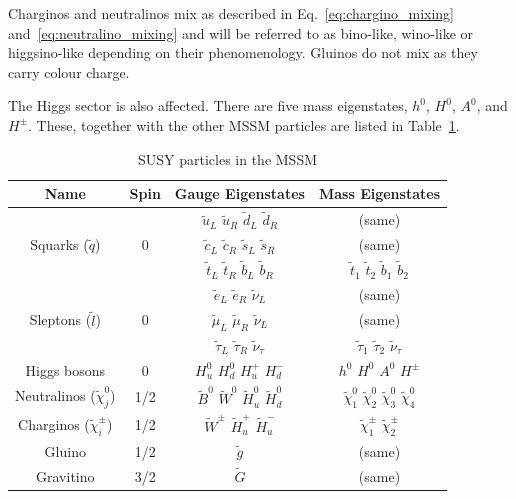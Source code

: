 				Charginos and neutralinos mix as described in Eq.~\ref{eq:chargino_mixing} and~\ref{eq:neutralino_mixing} and will be referred to as bino-like, wino-like or higgsino-like depending on their phenomenology. Gluinos do not mix as they carry colour charge. 

				The Higgs sector is also affected. There are five mass eigenstates, $h^0$, $H^0$, $A^0$, and $H^{\pm}$. These, together with the other MSSM particles are listed in Table~\ref{tab:MSSM_particles}. 
				
				\begin{table}[!htb]\centering\caption{SUSY particles in the MSSM}							
					\begin{tabular}{|c|c|c|c|}
						\hline
						\textbf{Name} & \textbf{Spin} & \textbf{Gauge Eigenstates} & \textbf{Mass Eigenstates} \\ \hline \hline
						
						\multirow{3}{*}{Squarks ($\tilde{q}$)} & \multirow{3}{*}{0} 
						& $\tilde{u}_L$ $\tilde{u}_R$ $\tilde{d}_L$ $\tilde{d}_R$ & (same) \\
						& & $\tilde{c}_L$ $\tilde{c}_R$ $\tilde{s}_L$ $\tilde{s}_R$ & (same) \\
						& & $\tilde{t}_L$ $\tilde{t}_R$ $\tilde{b}_L$ $\tilde{b}_R$ & $\tilde{t}_1$ $\tilde{t}_2$ $\tilde{b}_1$ $\tilde{b}_2$ \\ \hline

						\multirow{3}{*}{Sleptons ($\tilde{l}$)} & \multirow{3}{*}{0} 
						& $\tilde{e}_L$ $\tilde{e}_R$ $\tilde{\nu}_L$ & (same) \\
						& & $\tilde{\mu}_L$ $\tilde{\mu}_R$ $\tilde{\nu}_L$ & (same) \\ 
						& & $\tilde{\tau}_L$ $\tilde{\tau}_R$ $\tilde{\nu}_{\tau}$ & $\tilde{\tau}_1$ $\tilde{\tau}_2$ $\tilde{\nu}_{\tau}$ \\ \hline
						
						Higgs bosons & 0 & $H_u^0$ $H_d^0$ $H_u^+$ $H_d^-$ & $h^0$ $H^0$ $A^0$ $H^{\pm}$ \\ \hline 

						Neutralinos ($\tilde{\chi}_j^0$)   & 1/2 & $\tilde{B}^0$ $\tilde{W}^0$ $\tilde{H}_u^0$ $\tilde{H}_d^0$ & $\tilde{\chi}_1^0$ $\tilde{\chi}_2^0$ $\tilde{\chi}_3^0$ $\tilde{\chi}_4^0$\\
						Charginos ($\tilde{\chi}_i^{\pm}$) & 1/2 & $\tilde{W}^{\pm}$ $\tilde{H}_u^+$ $\tilde{H}_u^-$ & $\tilde{\chi}_1^{\pm}$ $\tilde{\chi}_2^{\pm}$ \\ \hline

						Gluino & 1/2 & $\tilde{g}$ & (same) \\
						Gravitino & 3/2 & $\tilde{G}$ & (same) \\ \hline					
					\end{tabular}						
				\label{tab:MSSM_particles} 
				\end{table}


